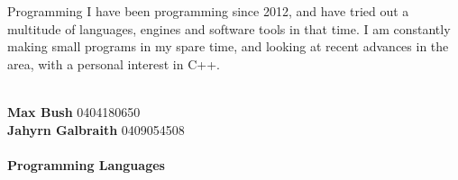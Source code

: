 \documentclass[9pt]{developercv}
\newcommand{\CC}{C\nolinebreak\hspace{-.05em}\raisebox{.4ex}{\tiny\bf +}\nolinebreak\hspace{-.10em}\raisebox{.4ex}{\tiny\bf +}}
\def\CC{{C\nolinebreak[4]\hspace{-.05em}\raisebox{.4ex}{\tiny\bf ++}}}
\begin{document}
\begin{minipage}[t]{0.6\textwidth}
\begin{entrylist}
		\end{entrylist}
		\begin{entrylist}
			\entry
				{\vphantom{1.0}}
				{Programming}
				{}
				{I have been programming since 2012, and have tried out a multitude of languages, engines and software tools in that time. I am constantly making small programs in my spare time, and looking at recent advances in the area, with a personal interest in C++.}
		\end{entrylist}
	\end{minipage}
\begin{minipage}[t]{0.1\textwidth}
\hphantom{0.1}
\end{minipage}
	\begin{minipage}[t]{0.3\textwidth}
		\\
		\textbf{Max Bush} 0404180650\\
		\textbf{Jahyrn Galbraith} 0409054508\\

			\\\textbf{Programming Languages}\\
			\begin{barchart}{3.0}
				\baritem{\CC}{100}
			\end{barchart}
	\end{minipage}
\end{document}
